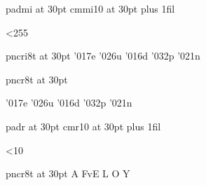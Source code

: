 \baselineskip=35pt

\font\test padmi at 30pt
\font\orig cmmi10 at 30pt
\rightskip=0pt plus 1fil \parfillskip=0pt
\test
\newcount\testcount {}

\loop\char\testcount\kern 2pt{\orig\char\testcount}
\ifnum\testcount<255\advance{}\repeat

\font\pad pncri8t at 30pt
\pad
{\test\char'017\/}e {\test\char'026\/}u {\test\char'016\/}d
{\test\char'032\/}p
{\test\char'021\/}n

\font\pad pncr8t at 30pt
\pad
\par
{\test\char'017\/}e {\test\char'026\/}u {\test\char'016\/}d
{\test\char'032\/}p
{\test\char'021\/}n


\font\test padr at 30pt
\font\orig cmr10 at 30pt
\rightskip=0pt plus 1fil \parfillskip=0pt
\test
\newcount\testcount {}

\loop\char\testcount\hskip 2pt{\orig\char\testcount}\hskip 2pt
\ifnum\testcount<10\advance{}\repeat

\font\pad pncr8t at 30pt
\pad
{\test{}\/}A{\test{}\/}
\quad
Fv{\test{}\/}E L
\quad
O{\test{}\/}
\quad
Y{\test{}\/}

\bye
